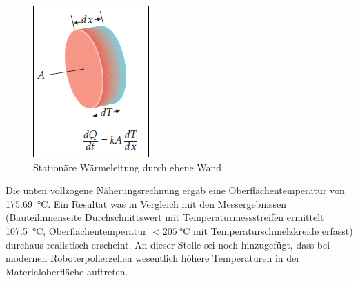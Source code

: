 \documentclass[12pt,a4paper,parskip]{scrartcl}
\begin{document}
\begin{figure}[H]
\centering
\includegraphics[width=.8\textwidth]{warmleittip}
\caption{Stationäre Wärmeleitung durch ebene Wand\protect\footnotemark}
\label{tipler}
\end{figure}  
Die unten vollzogene Näherungsrechnung ergab eine Oberflächentemperatur von \SI{175.69}{\degreeCelsius}. Ein Resultat was in Vergleich mit den Messergebnissen (Bauteilinnenseite Durchschnittswert mit Temperaturmessstreifen ermittelt \SI{107.5}{\degreeCelsius}, Oberflächentemperatur $< \SI{205}{\degreeCelsius}$ mit Temperaturschmelzkreide erfasst) durchaus realistisch erscheint.
An dieser Stelle sei noch hinzugefügt, dass  bei modernen Roboterpolierzellen wesentlich höhere Temperaturen in der Materialoberfläche auftreten.
\end{document}
